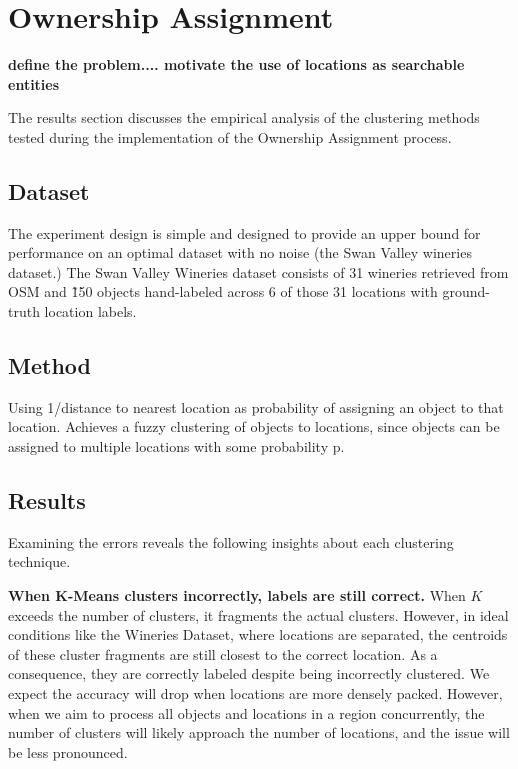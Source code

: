 \section{Ownership Assignment}
\label{section:ownership}

\textbf{define the problem.... motivate the use of locations as searchable entities}


The results section discusses the empirical analysis of the clustering methods tested during the implementation of the Ownership Assignment process. 

\subsection{Dataset}
The experiment design is simple and designed to provide an upper bound for performance on an optimal dataset with no noise (the Swan Valley wineries dataset.) 
The Swan Valley Wineries dataset consists of 31 wineries retrieved from OSM and \~150 objects hand-labeled across 6 of those 31 locations with ground-truth location labels.


\subsection{Method}
Using 1/distance to nearest location as probability of assigning an object to that location.
Achieves a fuzzy clustering of objects to locations, since objects can be assigned to multiple locations with some probability p.


\subsection{Results}
Examining the errors reveals the following insights about each clustering technique. 

\textbf{When K-Means clusters incorrectly, labels are still correct.} When $K$ exceeds the number of clusters, it fragments the actual clusters. 
However, in ideal conditions like the Wineries Dataset, where locations are separated, the centroids of these cluster fragments are still closest to the correct location. 
As a consequence, they are correctly labeled despite being incorrectly clustered. We expect the accuracy will drop when locations are more densely packed. However, when we aim to process all objects and locations in a region concurrently, the number of clusters will likely approach the number of locations, and the issue will be less pronounced. 


